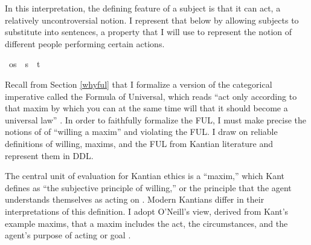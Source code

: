 \begin{isabellebody}
\begin{isamarkuptext}
In this interpretation, the defining feature of a subject is that it can act, a relatively uncontroversial
notion. I represent that below by allowing subjects to substitute into sentences, a property that I will use 
to represent the notion of different people performing certain actions.%
\end{isamarkuptext}\isamarkuptrue%
\isamarkupfalse%
\ os\ {\isacharequal}\ {\isachardoublequoteopen}{\isacharparenleft}s\ {\isasymRightarrow}\ t{\isacharparenright}{\isachardoublequoteclose}\ %
%
\isadelimdocument
%
\endisadelimdocument
%
\isatagdocument
%
\isamarkuptrue%
%
\endisatagdocument
{\isafolddocument}%
%
\isadelimdocument
%
\endisadelimdocument
%
\begin{isamarkuptext}%
Recall from Section \ref{whyful} that I formalize a version of the categorical imperative called
the Formula of Universal, which reads ``act only according to that maxim by which you can at the same 
time will that it should become a universal law'' \cite{groundwork}. In order to faithfully formalize
the FUL, I must make precise the notions of of ``willing a maxim'' and violating the FUL. I draw on 
reliable definitions of willing, maxims, and the FUL from Kantian literature and represent them in DDL.

The central unit of evaluation for Kantian ethics is a ``maxim,'' which Kant defines as ``the subjective 
principle of willing,'' or the principle that the agent understands themselves as acting on \cite{groundwork}. 
Modern Kantians differ in their interpretations of this definition. I adopt O'Neill's view, derived from 
Kant's example maxims, that a maxim includes the act, the circumstances, and the agent's purpose of 
acting or goal \citep{actingonprinciple}. 


\end{isamarkuptext}
\end{isabellebody}
